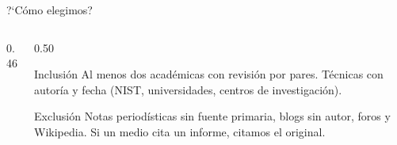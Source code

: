 \begin{frame}{?`C\'omo elegimos?}
  \begin{columns}[c]
    \begin{column}{0.46\textwidth}
      \centering
    \end{column}
    \begin{column}{0.50\textwidth}
      \begin{exampleblock}{Inclusi\'on}
        \scriptsize
        Al menos dos acad\'emicas con revisi\'on por pares. T\'ecnicas con
        autor\'ia y fecha (NIST, universidades, centros de investigaci\'on).
      \end{exampleblock}
      \begin{alertblock}{Exclusi\'on}
        \scriptsize
        Notas period\'isticas sin fuente primaria, blogs sin autor, foros y
        Wikipedia. Si un medio cita un informe, citamos el original.
      \end{alertblock}
    \end{column}
  \end{columns}
\end{frame}